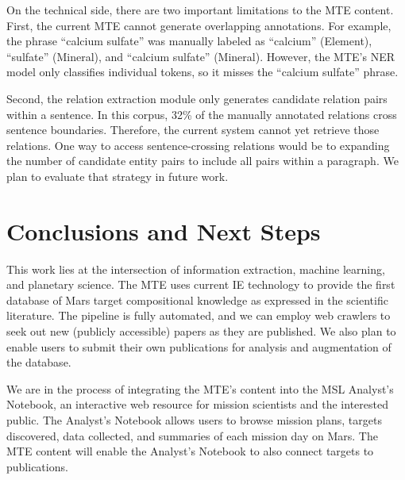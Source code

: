 \documentclass[letterpaper]{article} %
\begin{document}
On the technical side, there are two important limitations to the MTE
content.  First, the current MTE cannot generate overlapping
annotations.  For example, the phrase ``calcium sulfate'' was manually
labeled as ``calcium'' (Element), ``sulfate'' (Mineral), and
``calcium sulfate'' (Mineral).  However, the MTE's NER model only
classifies individual tokens, so it misses the ``calcium sulfate''
phrase. 

Second, the relation extraction module only generates candidate
relation pairs within a sentence.  In this corpus, 32\% of the
manually annotated relations cross sentence boundaries.  Therefore,
the current system cannot yet retrieve those relations.  
%
One way to access sentence-crossing relations would be to expanding the
number of candidate entity pairs to include all pairs within a
paragraph.  We plan to evaluate that strategy in future work.


\section{Conclusions and Next Steps}

This work lies at the intersection of information extraction, machine
learning, and planetary science.  The MTE uses current IE technology
to provide the first database of Mars target compositional knowledge
as expressed in the scientific literature.  The pipeline is fully
automated, and we can employ web crawlers to seek out new (publicly
accessible) papers as they are published.  We also plan to enable
users to submit their own publications for analysis and augmentation
of the database.

We are in the process of integrating the MTE's content into the MSL
Analyst's Notebook, an interactive web resource for mission scientists
and the interested public.  The Analyst's Notebook allows users to
browse mission plans, targets discovered, data collected, and
summaries of each mission day on Mars.  The MTE content will enable
the Analyst's Notebook to also connect targets to publications.
\end{document}

